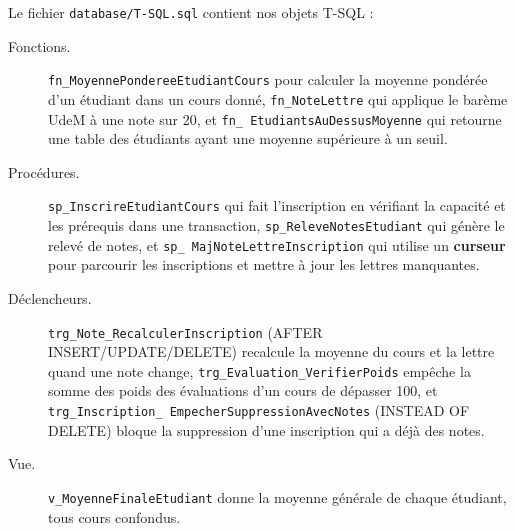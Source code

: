 \documentclass[11pt,a4paper]{article}
\begin{document}
Le fichier \texttt{database/T-SQL.sql} contient nos objets T-SQL :

\begin{description}
    \item[Fonctions.]
        \texttt{fn\_\allowbreak MoyennePondereeEtudiantCours} pour
        calculer la moyenne pondérée d'un étudiant dans un cours donné,
        \texttt{fn\_\allowbreak NoteLettre} qui applique le barème UdeM
        à une note sur 20, et \texttt{fn\_\allowbreak
        EtudiantsAuDessusMoyenne} qui retourne une table des étudiants
        ayant une moyenne supérieure à un seuil.
    \item[Procédures.]
        \texttt{sp\_\allowbreak InscrireEtudiantCours} qui fait
        l'inscription en vérifiant la capacité et les prérequis dans
        une transaction, \texttt{sp\_\allowbreak ReleveNotesEtudiant}
        qui génère le relevé de notes, et \texttt{sp\_\allowbreak
        MajNoteLettreInscription} qui utilise un \textbf{curseur} pour
        parcourir les inscriptions et mettre à jour les lettres
        manquantes.
    \item[Déclencheurs.]
        \texttt{trg\_\allowbreak Note\_\allowbreak RecalculerInscription}
        (AFTER INSERT/UPDATE/DELETE) recalcule la moyenne du cours et
        la lettre quand une note change,
        \texttt{trg\_\allowbreak Evaluation\_\allowbreak VerifierPoids}
        empêche la somme des poids des évaluations d'un cours de
        dépasser 100, et
        \texttt{trg\_\allowbreak Inscription\_\allowbreak
        EmpecherSuppression\allowbreak AvecNotes} (INSTEAD OF DELETE)
        bloque la suppression d'une inscription qui a déjà des notes.
    \item[Vue.]
        \texttt{v\_\allowbreak MoyenneFinaleEtudiant} donne la moyenne
        générale de chaque étudiant, tous cours confondus.
\end{description}
\end{document}
